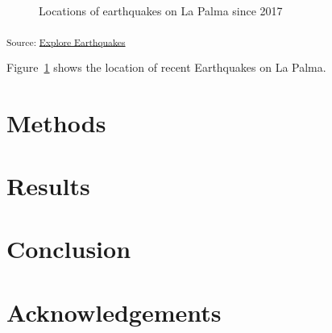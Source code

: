 \documentclass[
]{agujournal2019}
\begin{document}
\begin{figure}[H]


\caption{\label{fig-spatial-plot}Locations of earthquakes on La Palma
since 2017}

\end{figure}%

\textsubscript{Source:
\href{https://Scott-Akenhead.github.io/MS-Open-Salmon-KG/notebooks/explore-earthquakes-preview.html\#cell-fig-spatial-plot}{Explore
Earthquakes}}

Figure~\ref{fig-spatial-plot} shows the location of recent Earthquakes
on La Palma.

\section{Methods}\label{sec-methods}

\section{Results}\label{results}

\section{Conclusion}\label{conclusion}

\section{Acknowledgements}\label{acknowledgements}
\end{document}
